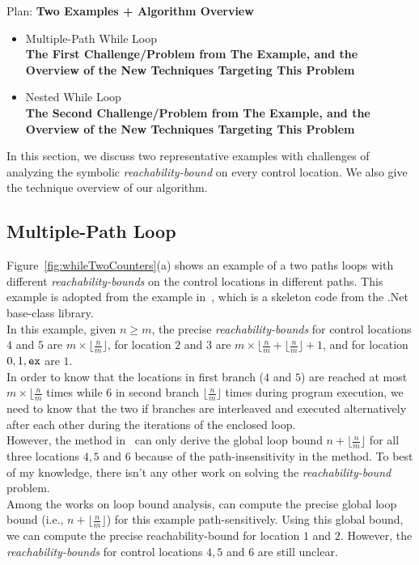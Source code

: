 Plan:
\textbf{Two Examples + Algorithm Overview}
\begin{itemize}
\item {Multiple-Path While Loop}
\\
\textbf{The First Challenge/Problem from The Example, 
and the Overview of the New Techniques Targeting This Problem}
\item {Nested While Loop}
\\
\textbf{The Second Challenge/Problem from The Example,
and the Overview of the New Techniques Targeting This Problem}
\end{itemize}
In this section, we discuss two representative examples with
challenges of analyzing the symbolic
\emph{reachability-bound} on
every control location.
We also give the technique overview of our algorithm.
%
\subsection{Multiple-Path Loop}
\label{sec:overview-multiplepath}

Figure~\ref{fig:whileTwoCounters}(a) shows an example of a two paths loops
with different \emph{reachability-bounds} on the control locations in different paths.
This example is adopted from the example in~\cite{Sumit2010rechability}, which
is a skeleton code from the .Net base-class library.
\\
In this example, given $n \geq m$,
the precise \emph{reachability-bounds} for control locations $4$ and $5$ are $m \times \lfloor\frac{n}{m}\rfloor$,
for location $2$ and $3$ are $m \times \lfloor\frac{n}{m} + \lfloor\frac{n}{m}\rfloor + 1$, 
and for location $0, 1, {\mathtt{ex}}$ are $1$.
\\
In order to know that the locations in first branch ($4$ and $5$) are reached at most $m \times \lfloor\frac{n}{m}$ times
while $6$ in second branch $\lfloor\frac{n}{m}\rfloor$ times
 during program execution,
we need to know that the two if branches are interleaved and executed alternatively after each other
during the iterations of the enclosed loop.
\\
However, the method in~\cite{Sumit2010rechability}
can only derive the global loop bound $n + \lfloor\frac{n}{m}\rfloor$
for all three locations $4, 5$ and $6$ because of the path-insensitivity in the method.
To best of my knowledge, there isn't any other work on solving the \emph{reachability-bound} problem.
\\
Among the works on loop bound analysis, \cite{GulwaniJK09} can compute the precise global
loop bound (i.e., $n + \lfloor\frac{n}{m}\rfloor$) for this example path-sensitively.
Using this global bound, we can compute the precise reachability-bound for location $1$ and $2$.
However, the  \emph{reachability-bounds} for control locations $4, 5$ and $6$ are still unclear.
